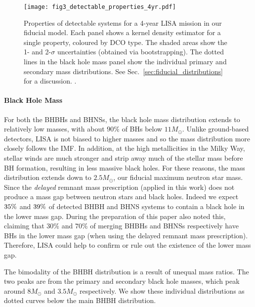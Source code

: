 \begin{figure*}[t]
    \centering
    \texttt{[image: fig3\_detectable\_properties\_4yr.pdf]}
    \caption{Properties of detectable systems for a 4-year LISA mission in our fiducial model. Each panel shows a kernel density estimator for a single property, coloured by DCO type. The shaded areas show the 1- and 2-$\sigma$ uncertainties (obtained via bootstrapping). The dotted lines in the black hole mass panel show the individual primary and secondary mass distributions. See Sec.~\ref{sec:fiducial_distributions} for a discussion. \href{https://github.com/TomWagg/detecting-DCOs-in-LISA/blob/main/paper/figures/fig3_detectable_properties_4yr.png}{\faFileImage} \href{https://github.com/TomWagg/detecting-DCOs-in-LISA/blob/main/paper/figure_notebooks/fiducial.ipynb}{\faBook}.}
    \label{fig:fiducial_pdf_distributions}
\end{figure*}

\paragraph{Black Hole Mass}
For both the BHBHs and BHNSs, the black hole mass distribution extends to relatively low masses, with about $90\%$ of BHs below $11 \unit{M_{\odot}}$. Unlike ground-based detectors, LISA is not biased to higher masses and so the mass distribution more closely follows the IMF. In addition, at the high metallicities in the Milky Way, stellar winds are much stronger and strip away much of the stellar mass before BH formation, resulting in less massive black holes. For these reasons, the mass distribution extends down to $2.5 \unit{M_{\odot}}$, our fiducial maximum neutron star mass. Since the \citet{Fryer+2012} \textit{delayed} remnant mass prescription (applied in this work) does not produce a mass gap between neutron stars and black holes. Indeed we expect $35\%{}$ and $39\%{}$ of detected BHBH and BHNS systems to contain a black hole in the lower mass gap. During the preparation of this paper \citet{Shao+2021} also noted this, claiming that $30\%$ and $70\%$ of merging BHBHs and BHNSs respectively have BHs in the lower mass gap (when using the delayed remnant mass prescription). Therefore, LISA could help to confirm or rule out the existence of the lower mass gap.

The bimodality of the BHBH distribution is a result of unequal mass ratios. The two peaks are from the primary and secondary black hole masses, which peak around $8 \unit{M_{\odot}}$ and $3.5 \unit{M_{\odot}}$ respectively. We show these individual distributions as dotted curves below the main BHBH distribution.

